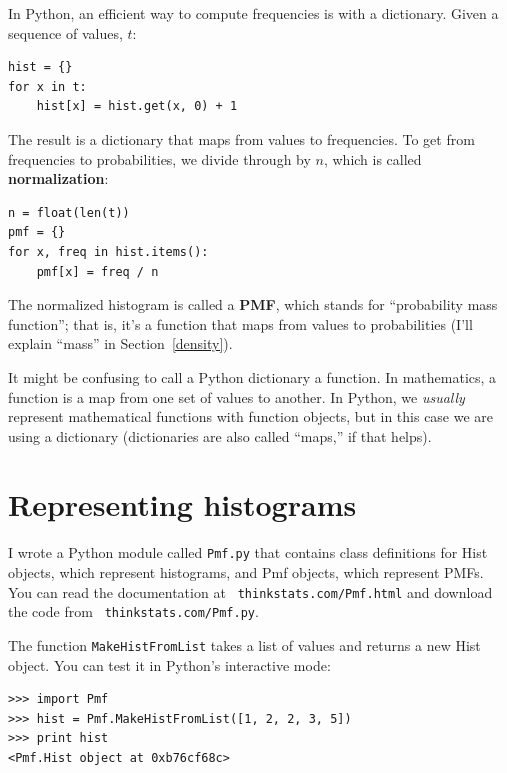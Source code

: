 \documentclass[12pt]{book}
\begin{document}

In Python, an efficient way to compute frequencies is with a dictionary.
Given a sequence of values, $t$:

\begin{verbatim}
hist = {}
for x in t:
    hist[x] = hist.get(x, 0) + 1
\end{verbatim}

The result is a dictionary that maps from values to frequencies.
To get from frequencies to probabilities, we divide through by $n$,
which is called {\bf normalization}:


\begin{verbatim}
n = float(len(t))
pmf = {}
for x, freq in hist.items():
    pmf[x] = freq / n
\end{verbatim}


The normalized histogram is called a {\bf PMF}, which stands for
``probability mass function''; that is, it's a function that maps from
values to probabilities (I'll explain ``mass'' in
Section~\ref{density}).

It might be confusing to call a Python dictionary a function.  In
mathematics, a function is a map from one set of values to
another.  In Python, we {\em usually} represent mathematical functions
with function objects, but in this case we are using a dictionary
(dictionaries are also called ``maps,'' if that helps).



\section{Representing histograms}

I wrote a Python module called {\tt Pmf.py} that contains class
definitions for Hist objects, which represent histograms, and Pmf
objects, which represent PMFs.  You can read the documentation at {\tt
  thinkstats.com/Pmf.html} and download the code from {\tt
  thinkstats.com/Pmf.py}.

The function {\tt MakeHistFromList} takes a list of values and
returns a new Hist object.  You can test it in Python's interactive
mode:

\begin{verbatim}
>>> import Pmf
>>> hist = Pmf.MakeHistFromList([1, 2, 2, 3, 5])
>>> print hist
<Pmf.Hist object at 0xb76cf68c>
\end{verbatim}
\end{document}
